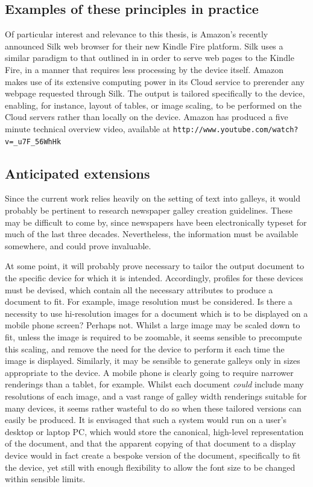 \subsection{Examples of these principles in practice}
Of particular interest and relevance to this thesis, is Amazon's recently announced Silk web browser
for their new Kindle Fire platform. Silk uses a similar paradigm to that outlined in
\cite{Pinkney2011} in order to serve web pages to the Kindle Fire, in a manner that requires less
processing by the device itself. Amazon makes use of its extensive computing power in its Cloud
service to prerender any webpage requested through Silk. The output is tailored specifically to the
device, enabling, for instance, layout of tables, or image scaling, to be performed on the Cloud
servers rather than locally on the device. Amazon has produced a five minute technical overview
video, available at \verb+http://www.youtube.com/watch?v=_u7F_56WhHk+


\subsection{Anticipated extensions}
Since the current work relies heavily on the setting of text into galleys, it would probably be
pertinent to research newspaper galley creation guidelines. These may be difficult to come by, since
newspapers have been electronically typeset for much of the last three decades. Nevertheless, the
information must be available somewhere, and could prove invaluable.

At some point, it will probably prove necessary to tailor the output document to the specific device
for which it is intended. Accordingly, profiles for these devices must be devised, which contain all
the necessary attributes to produce a document to fit. For example, image resolution must be
considered. Is there a necessity to use hi-resolution images for a document which is to be displayed
on a mobile phone screen? Perhaps not. Whilst a large image may be scaled down to fit, unless the
image is required to be zoomable, it seems sensible to precompute this scaling, and remove the need
for the device to perform it each time the image is displayed. Similarly, it may be sensible to
generate galleys only in sizes appropriate to the device. A mobile phone is clearly going to require
narrower renderings than a tablet, for example. Whilst each document \emph{could} include many
resolutions of each image, and a vast range of galley width renderings suitable for many devices, it
seems rather wasteful to do so when
these tailored versions can easily be produced. It is envisaged that such a system would run on a
user's desktop or laptop PC, which would store the canonical, high-level representation of the
document, and that the apparent copying of that document to a display device would in fact create a
bespoke version of the document, specifically to fit the device, yet still with enough flexibility
to allow the font size to be changed within sensible limits.

